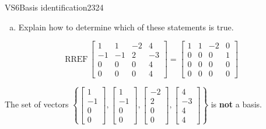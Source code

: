 \begin{exercise}{VS6}{Basis identification}{2324}
\begin{exerciseStatement}
\begin{enumerate}[(a)]
\begin{itemize}
 
\end{itemize}

     
\item  

 Explain how to determine which of these statements is true. 

 
\end{enumerate}

     \end{exerciseStatement}
 \begin{exerciseAnswer} 

 \[
\mathrm{RREF}\, \left[\begin{array}{cccc}
1 & 1 & -2 & 4 \\
-1 & -1 & 2 & -3 \\
0 & 0 & 0 & 4 \\
0 & 0 & 0 & 4
\end{array}\right] = \left[\begin{array}{cccc}
1 & 1 & -2 & 0 \\
0 & 0 & 0 & 1 \\
0 & 0 & 0 & 0 \\
0 & 0 & 0 & 0
\end{array}\right]
            \] 

 

 The set of vectors \(\left\{ \left[\begin{array}{c}
1 \\
-1 \\
0 \\
0
\end{array}\right] , \left[\begin{array}{c}
1 \\
-1 \\
0 \\
0
\end{array}\right] , \left[\begin{array}{c}
-2 \\
2 \\
0 \\
0
\end{array}\right] , \left[\begin{array}{c}
4 \\
-3 \\
4 \\
4
\end{array}\right] \right\}\) is \textbf{not} a basis. 

 \end{exerciseAnswer}
 \end{exercise}


